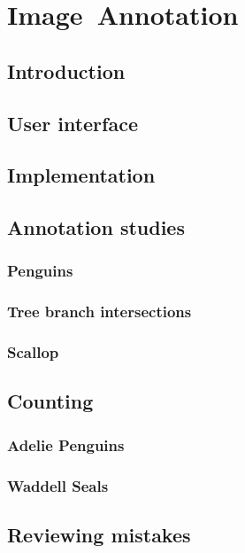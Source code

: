 \chapter{Image~Annotation}
\label{chap:annotation} 


\section{Introduction}

\section {User interface}


\section {Implementation}

\section{Annotation studies}

\subsection {Penguins}
\subsection{Tree branch intersections}
\subsection{Scallop}


\section{Counting}

\subsection{Adelie Penguins}
\subsection{Waddell Seals}




\section {Reviewing mistakes}